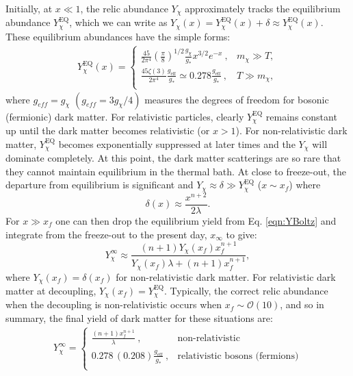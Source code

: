 Initially, at $x \ll 1$, the relic abundance $Y_{\chi}$ approximately tracks the equilibrium abundance $Y^{\text{EQ}}_{\chi}$, which we can write as $Y_{\chi}(x)=Y^{\text{EQ}}_{\chi}(x)+\delta \approx Y^{\text{EQ}}_{\chi}(x)$. These equilibrium abundances have the simple forms:
\begin{eqnarray}
Y_{\chi}^{\text{EQ}}(x)=\left\lbrace
\begin{array}{ll}
\frac{45}{2\pi^4}\left(\frac{\pi}{8}\right)^{1/2}\frac{g_{\chi}}{g_{*}}x^{3/2}{e}^{-x}~, & m_{\chi} \gg T, \\
	\frac{45\zeta(3)}{2\pi^4}\frac{g_{\text{eff}}}{g_{*}} \simeq 0.278\frac{g_{\text{eff}}}{g_{*}}~, & T \gg m_{\chi}, \\ 
\end{array} 
\right.
\label{eqn:equilbabund}
\end{eqnarray}
where $g_{eff}=g_{\chi}$ $(g_{eff}=3g_{\chi}/4)$ measures the degrees of freedom for bosonic (fermionic) dark matter. For relativistic particles, clearly $Y_{\chi}^{\text{EQ}}$ remains constant up until the dark matter becomes relativistic (or $x>1$). For non-relativistic dark matter, $Y_{\chi}^{\text{EQ}}$ becomes exponentially suppressed at later times and the $Y_{\chi}$ will dominate completely. At this point, the dark matter scatterings are so rare that they cannot maintain equilibrium in the thermal bath. At close to freeze-out, the departure from equilibrium is significant and $Y_{\chi} \approx \delta \gg Y_{\chi}^{\text{EQ}}$ ($x \sim x_f$) where
\begin{equation}
\delta(x) \approx \frac{x^{n+2}}{2\lambda}.
\label{eqn:delta}
\end{equation}
For $x \gg x_f$ one can then drop the equilibrium yield from Eq. \ref{eqn:YBoltz} and integrate from the freeze-out to the present day, $x_{\infty}$ to give:
\begin{equation}
Y^{\infty}_{\chi} \approx \frac{(n+1)Y_{\chi}(x_f)x^{n+1}_f}{Y_{\chi}(x_f)\lambda + (n+1)x^{n+1}_f},
\label{eqn:Yxf}
\end{equation}
where $Y_{\chi}(x_f)=\delta(x_f)$ for non-relativistic dark matter. For relativistic dark matter at decoupling, $Y_{\chi}(x_f)=Y_{\chi}^{\text{EQ}}$. Typically, the correct relic abundance when the decoupling is non-relativistic occurs when $x_f \sim \mathcal{O}(10)$, and so in summary, the final yield of dark matter for these situations are:
\begin{eqnarray}
Y^{\infty}_{\chi}=\left\lbrace
\begin{array}{ll}
\frac{(n+1)x^{n+1}_f}{\lambda}~, & \text{non-relativistic} \\
0.278\,(0.208)\frac{g_{\text{eff}}}{g_{*}}~, & \text{relativistic bosons (fermions)} \\ 
\end{array} 
\right.
\label{eqn:Ychiinf}
\end{eqnarray}
